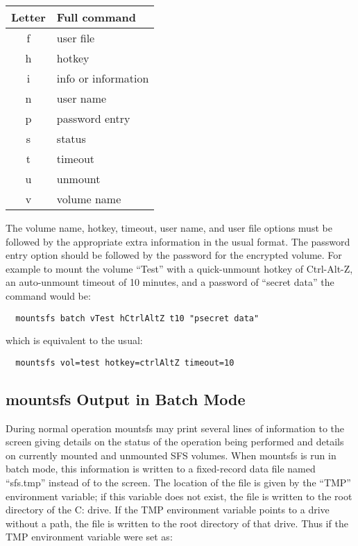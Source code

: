 \begin{center}
\begin{tabular}{|c|l|}
\hline
    Letter  &    Full command\\
\hline
      f     &    user file\\
      h     &    hotkey\\
      i     &    info or information\\
      n     &    user name\\
      p     &    password entry\\
      s     &    status\\
      t     &    timeout\\
      u     &    unmount\\
      v     &    volume name\\
\hline
\end{tabular}
\end{center}

The volume name, hotkey, timeout, user name, and user file options must be
followed by the appropriate extra information in the usual format.  The
password entry option should be followed by the password for the encrypted
volume.  For example to mount the volume ``Test'' with a quick-unmount hotkey of
Ctrl-Alt-Z, an auto-unmount timeout of 10 minutes, and a password of ``secret
data'' the command would be:

    {\tt \verb|  |mountsfs batch vTest hCtrlAltZ t10 "psecret data"}

which is equivalent to the usual:

    {\tt \verb|  |mountsfs vol=test hotkey=ctrlAltZ timeout=10}


\subsection{mountsfs Output in Batch Mode}

During normal operation mountsfs may print several lines of information to the
screen giving details on the status of the operation being performed and
details on currently mounted and unmounted SFS volumes.  When mountsfs is run
in batch mode, this information is written to a fixed-record data file named
``sfs.tmp'' instead of to the screen.  The location of the file is given by the
``TMP'' environment variable; if this variable does not exist, the file is
written to the root directory of the C: drive.  If the TMP environment variable
points to a drive without a path, the file is written to the root directory of
that drive.  Thus if the TMP environment variable were set as:


